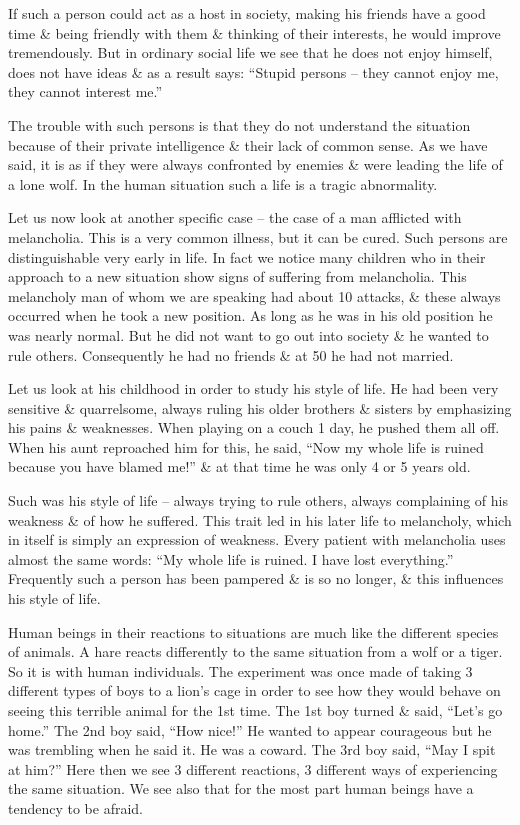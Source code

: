 \documentclass{article}
\numberwithin{equation}{section}
\begin{document}
If such a person could act as a host in society, making his friends have a good time \& being friendly with them \& thinking of their interests, he would improve tremendously. But in ordinary social life we see that he does not enjoy himself, does not have ideas \& as a result says: ``Stupid persons -- they cannot enjoy me, they cannot interest me.''

The trouble with such persons is that they do not understand the situation because of their private intelligence \& their lack of common sense. As we have said, it is as if they were always confronted by enemies \& were leading the life of a lone wolf. In the human situation such a life is a tragic abnormality.

Let us now look at another specific case -- the case of a man afflicted with melancholia. This is a very common illness, but it can be cured. Such persons are distinguishable very early in life. In fact we notice many children who in their approach to a new situation show signs of suffering from melancholia. This melancholy man of whom we are speaking had about 10 attacks, \& these always occurred when he took a new position. As long as he was in his old position he was nearly normal. But he did not want to go out into society \& he wanted to rule others. Consequently he had no friends \& at 50 he had not married.

Let us look at his childhood in order to study his style of life. He had been very sensitive \& quarrelsome, always ruling his older brothers \& sisters by emphasizing his pains \& weaknesses. When playing on a couch 1 day, he pushed them all off. When his aunt reproached him for this, he said, ``Now my whole life is ruined because you have blamed me!'' \& at that time he was only 4 or 5 years old.

Such was his style of life -- always trying to rule others, always complaining of his weakness \& of how he suffered. This trait led in his later life to melancholy, which in itself is simply an expression of weakness. Every patient with melancholia uses almost the same words: ``My whole life is ruined. I have lost everything.'' Frequently such a person has been pampered \& is so no longer, \& this influences his style of life.

Human beings in their reactions to situations are much like the different species of animals. A hare reacts differently to the same situation from a wolf or a tiger. So it is with human individuals. The experiment was once made of taking 3 different types of boys to a lion's cage in order to see how they would behave on seeing this terrible animal for the 1st time. The 1st boy turned \& said, ``Let's go home.'' The 2nd boy said, ``How nice!'' He wanted to appear courageous but he was trembling when he said it. He was a coward. The 3rd boy said, ``May I spit at him?'' Here then we see 3 different reactions, 3 different ways of experiencing the same situation. We see also that for the most part human beings have a tendency to be afraid.
\end{document}
